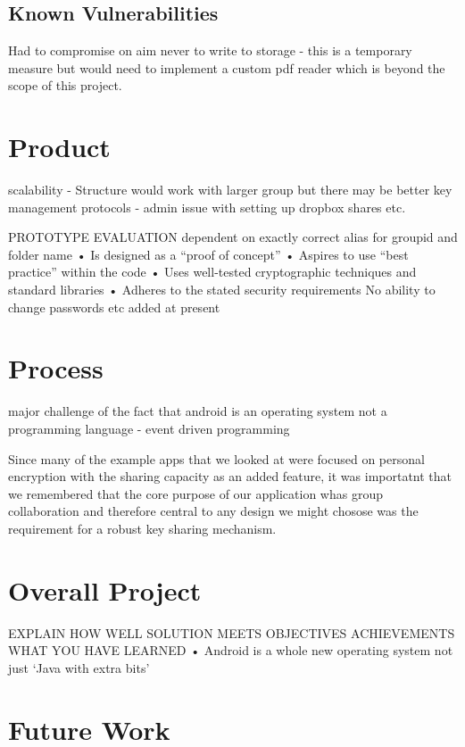 \subsection*{Known Vulnerabilities}
Had to compromise on aim never to write to storage - this is a temporary measure but would need to implement a custom pdf reader which is beyond the scope of this project. 

\section{Product}
scalability - Structure would work with larger group but there may be better key management protocols - admin issue with setting up dropbox shares etc.

PROTOTYPE EVALUATION
dependent on exactly correct alias for groupid and folder name
• Is designed as a “proof of concept”
• Aspires to use “best practice” within the code 
• Uses well-tested cryptographic techniques and standard libraries
• Adheres to the stated security requirements 
No ability to change passwords etc added at present
\section{Process}
major challenge of the fact that android is an operating system not a programming language - event driven programming

Since many of the example apps that we looked at were focused on personal encryption with the sharing capacity as an added feature, it was importatnt that we remembered that the core purpose of our application whas group collaboration and therefore central to any design we might chosose was the requirement for a robust key sharing mechanism.

\section{Overall Project}
EXPLAIN HOW WELL SOLUTION MEETS OBJECTIVES
ACHIEVEMENTS
WHAT YOU HAVE LEARNED
• Android is a whole new operating system not just ‘Java with extra bits’
\section{Future Work}



